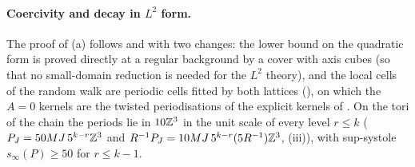 
\paragraph{Coercivity and decay in $L^2$ form.}
The proof of (a) follows \cite[\S2]{Ba4} and \cite[\S5.3]{K2} with two changes: the lower bound on the quadratic form is proved directly at a regular background by a cover with axis cubes (so that no small-domain reduction is needed for the $L^2$ theory), and the local cells of the random walk are periodic cells fitted by both lattices (\cite[(5.55)]{K2}), on which the $A=0$ kernels are the twisted periodisations of the explicit kernels of . On the tori of the chain the periods lie in $10\mathbb Z^3$ in the unit scale of every level $r\le k$ ($P_J=50MJ\,5^{k-r}\mathbb Z^3$ and $R^{-1}P_J=10MJ\,5^{k-r}(5R^{-1})\mathbb Z^3$, (iii)), with sup-systole $s_\infty(P)\ge50$ for $r\le k-1$.

